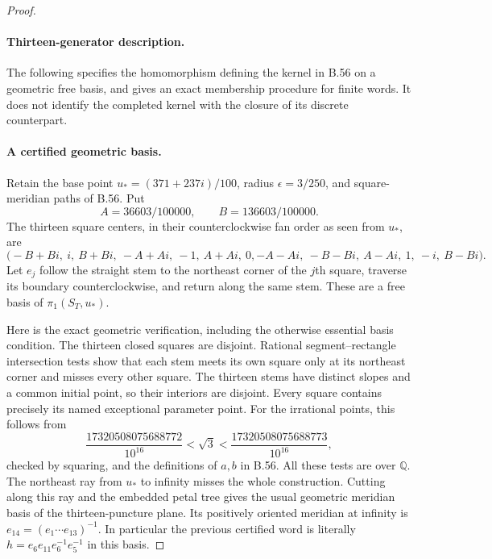\begin{proof}
\paragraph{Thirteen-generator description.}

The following specifies the homomorphism defining the kernel in B.56
on a geometric free basis, and gives an exact membership procedure
for finite words.  It does not identify the completed kernel with
the closure of its discrete counterpart.

\paragraph{A certified geometric basis.}
Retain the base point $u_*=(371+237i)/100$, radius
$\epsilon=3/250$, and square-meridian paths of B.56.
Put
\[
 A=36603/100000,\qquad B=136603/100000.
\]
The thirteen square centers, in their counterclockwise fan order
as seen from $u_*$, are
\[
 \bigl(-B+Bi,\ i,\ B+Bi,\ -A+Ai,\ -1,\ A+Ai,\ 0,
       -A-Ai,\ -B-Bi,\ A-Ai,\ 1,\ -i,\ B-Bi\bigr).
 \tag{B.56.5}
\]
Let $e_j$ follow the straight stem to the northeast corner of
the $j$th square, traverse its boundary counterclockwise, and
return along the same stem.  These are a free basis of
$\pi_1(S_T,u_*)$.

Here is the exact geometric verification, including the
otherwise essential basis condition.  The thirteen closed
squares are disjoint.  Rational segment--rectangle intersection
tests show that each stem meets its own square only at its
northeast corner and misses every other square.  The thirteen
stems have distinct slopes and a common initial point, so their
interiors are disjoint.  Every square contains precisely its
named exceptional parameter point.  For the irrational points,
this follows from
\[
 \frac{17320508075688772}{10^{16}}<\sqrt3<
 \frac{17320508075688773}{10^{16}},
\]
checked by squaring, and the definitions of $a,b$ in B.56.
All these tests are over $\mathbb Q$.  The northeast ray from
$u_*$ to infinity misses the whole construction.  Cutting along
this ray and the embedded petal tree gives the usual geometric
meridian basis of the thirteen-puncture plane.  Its positively
oriented meridian at infinity is
$e_{14}=(e_1\cdots e_{13})^{-1}$.
In particular the previous certified word is literally
$h=e_6e_{11}e_6^{-1}e_5^{-1}$ in this basis.


\end{proof}
